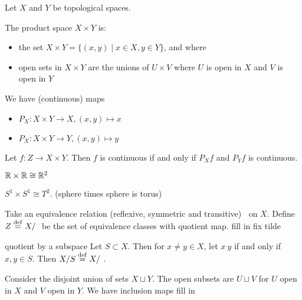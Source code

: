 Let $X$ and $Y$ be topological spaces.

\begin{defn}
	The product space $X \times Y$ is:
	\begin{itemize}
		\item the set $X \times Y = \{(x,y) \mid x \in X, y \in Y\}$, and where
		\item open sets in $X \times Y$ are the unions of $U \times V$ where $U$ is open in $X$ and $V$ is open in $Y$
	\end{itemize}
\end{defn}

We have (continuous) maps
\begin{itemize}
	\item $P_X: X \times Y \to X, (x,y) \mapsto x$
	\item $P_X: X \times Y \to Y, (x,y) \mapsto y$
\end{itemize}

\begin{exer}
	Let $f: Z \to X \times Y$.
	Then $f$ is continuous if and only if $P_Xf$ and $P_Yf$ is continuous.
\end{exer}

\begin{exam}
	\item $\mathbb{R} \times \mathbb{R} \cong \mathbb{R}^2$
	\item $S^1 \times S^1 \cong T^2$. (sphere times sphere is torus)
\end{exam}

\begin{defn}
	Take an equivalence relation (reflexive, symmetric and transitive) $~$ on $X$.
	Define $Z \overset{\mathrm{def}}{=} X/~$ be the set of equivalence classes with quotient map. fill in fix tilde
\end{defn}

\begin{exam}
	quotient by a subspace
	Let $S \subset X$.
	Then for $x \neq y \in X$, let $x~y$ if and only if $x,y \in S$.
	Then $X/S \overset{\mathrm{def}}{=} X/~$.
\end{exam}

\begin{defn}
	Consider the disjoint union of sets $X \sqcup Y$.
	The open subsets are $U \sqcup V$ for $U$ open in $X$ and $V$ open in $Y$.
	We have inclusion maps fill in
\end{defn}
